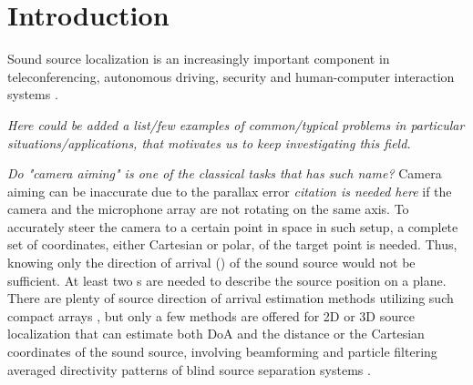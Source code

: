 \documentclass[applsci,article,submit,moreauthors,pdftex]{Definitions/mdpi}
\begin{document}


\section{Introduction}
Sound source localization is an increasingly important component in teleconferencing, autonomous driving, security and human-computer interaction systems \cite{martiSpeakerLocalizationDetection2011,lopatka_detection_2016,valinLocalizationSimultaneousMoving2004}.

\emph{Here could be added a list/few examples of common/typical problems in particular situations/applications, that motivates us to keep investigating this field.}

\emph{Do "camera aiming" is one of the classical tasks that has such name?} Camera aiming can be inaccurate due to the parallax error \emph{citation is needed here} if the camera and the microphone array are not rotating on the same axis. To accurately steer the camera to a certain point in space in such setup, a complete set of coordinates, either Cartesian or polar, of the target point is needed.
Thus, knowing only the direction of arrival (\doa{}) of the sound source would not be sufficient. At least two \doa{}s are needed to describe the source position on a plane.
There are plenty of source direction of arrival estimation methods utilizing such compact arrays \cite{bruttiComparisonDifferentSound2008,wengThreedimensionalSoundLocalization2001,awad-allaTwostageApproachPassive2020}, but only a few methods are offered for 2D or 3D source localization that can estimate both DoA and the distance or the Cartesian coordinates of the sound source, involving beamforming and particle filtering \cite{valinRobust3DLocalization2006} averaged directivity patterns of blind source separation systems \cite{4959563}.
\end{document}
